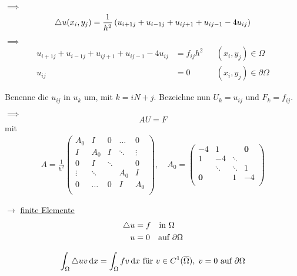 $\implies$
\begin{equation*}
	\mathop{}\!\mathbin\bigtriangleup u(x_i,y_j) = \frac{1}{h^2} \left( u_{i+1 j} + u_{i-1 j} + u_{i j+1} + u_{i j-1} - 4u_{i j} \right)
\end{equation*}

$\implies$
\begin{align*}
	 u_{i+1 j} + u_{i-1 j} + u_{i j+1} + u_{i j-1} - 4u_{i j} &= f_{i j}h^2 & & (x_i,y_j) \in \Omega\\
	 u_{i j} &= 0 & & (x_i,y_j) \in \partial\Omega 
\end{align*}

Benenne die $u_{ij}$ in $u_k$ um, mit $k = iN+j$. Bezeichne nun $U_k = u_{ij}$ und $F_k = f_{ij} $.

$\implies$
\begin{equation*}
	AU = F 
\end{equation*}
mit 
\begin{align*}
	A = \frac{1}{h^2}
	\begin{pmatrix}
	A_0       & I        & 0		&\dots  & 0     \\
	I		  & A_0 	 & I 		&\ddots & \vdots\\
	0		  & I        & \ddots 	&		& 0     \\
	\vdots    & \ddots   & 		  	& A_0	&	I   \\
	0		  & \dots 	 & 0  		& I 	& A_0   \\
	\end{pmatrix}, 
	\quad
	A_0 = 
	\begin{pmatrix}
	-4    		& 1      & 		  & \textbf{0}  \\
	1	  		& -4 	 & \ddots & 			\\
		  		& \ddots & \ddots &	1   \\
	\textbf{0}	& 	     & 1 	  & -4   \\
	\end{pmatrix}
\end{align*}


$\rightarrow$ \underline{finite Elemente}\enter
\enter
\begin{align*}
  \mathop{}\!\mathbin\bigtriangleup u &= f \quad  \text{in}\  \Omega\\
  u &= 0 \quad \text{auf}\ \partial\Omega
\end{align*}

\begin{equation*}
	\int_\Omega \mathop{}\!\mathbin\bigtriangleup u v \mathop{}\!\mathrm{d} x = \int_\Omega fv \mathop{}\!\mathrm{d} x \text { f\"ur } v\in C^1(\overline{\Omega}), \; v=0 \text{ auf } \partial \Omega
\end{equation*}

